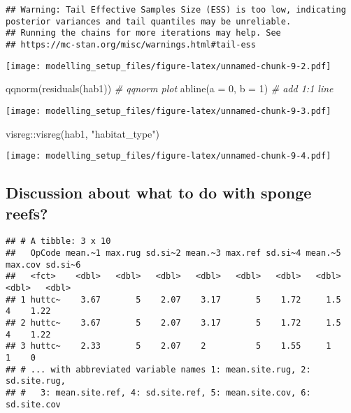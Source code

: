 \documentclass[
]{article}
\newenvironment{Shaded}{\begin{snugshade}}{\end{snugshade}}
\newcommand{\AttributeTok}[1]{\textcolor[rgb]{0.77,0.63,0.00}{#1}}
\newcommand{\CommentTok}[1]{\textcolor[rgb]{0.56,0.35,0.01}{\textit{#1}}}
\newcommand{\DecValTok}[1]{\textcolor[rgb]{0.00,0.00,0.81}{#1}}
\newcommand{\FunctionTok}[1]{\textcolor[rgb]{0.00,0.00,0.00}{#1}}
\newcommand{\NormalTok}[1]{#1}
\newcommand{\SpecialCharTok}[1]{\textcolor[rgb]{0.00,0.00,0.00}{#1}}
\newcommand{\StringTok}[1]{\textcolor[rgb]{0.31,0.60,0.02}{#1}}
\begin{document}
\begin{verbatim}
## Warning: Tail Effective Samples Size (ESS) is too low, indicating posterior variances and tail quantiles may be unreliable.
## Running the chains for more iterations may help. See
## https://mc-stan.org/misc/warnings.html#tail-ess
\end{verbatim}

\texttt{[image: modelling\_setup\_files/figure-latex/unnamed-chunk-9-2.pdf]}

\begin{Shaded}
\begin{Highlighting}[]
\FunctionTok{qqnorm}\NormalTok{(}\FunctionTok{residuals}\NormalTok{(hab1)) }\CommentTok{\# qqnorm plot}
\FunctionTok{abline}\NormalTok{(}\AttributeTok{a =} \DecValTok{0}\NormalTok{, }\AttributeTok{b =} \DecValTok{1}\NormalTok{) }\CommentTok{\# add 1:1 line}
\end{Highlighting}
\end{Shaded}

\texttt{[image: modelling\_setup\_files/figure-latex/unnamed-chunk-9-3.pdf]}

\begin{Shaded}
\begin{Highlighting}[]
\NormalTok{visreg}\SpecialCharTok{::}\FunctionTok{visreg}\NormalTok{(hab1, }\StringTok{"habitat\_type"}\NormalTok{)}
\end{Highlighting}
\end{Shaded}

\texttt{[image: modelling\_setup\_files/figure-latex/unnamed-chunk-9-4.pdf]}

\hypertarget{discussion-about-what-to-do-with-sponge-reefs}{%
\subsection{Discussion about what to do with sponge
reefs?}\label{discussion-about-what-to-do-with-sponge-reefs}}

\begin{verbatim}
## # A tibble: 3 x 10
##   OpCode mean.~1 max.rug sd.si~2 mean.~3 max.ref sd.si~4 mean.~5 max.cov sd.si~6
##   <fct>    <dbl>   <dbl>   <dbl>   <dbl>   <dbl>   <dbl>   <dbl>   <dbl>   <dbl>
## 1 huttc~    3.67       5    2.07    3.17       5    1.72     1.5       4    1.22
## 2 huttc~    3.67       5    2.07    3.17       5    1.72     1.5       4    1.22
## 3 huttc~    2.33       5    2.07    2          5    1.55     1         1    0   
## # ... with abbreviated variable names 1: mean.site.rug, 2: sd.site.rug,
## #   3: mean.site.ref, 4: sd.site.ref, 5: mean.site.cov, 6: sd.site.cov
\end{verbatim}
\end{document}
